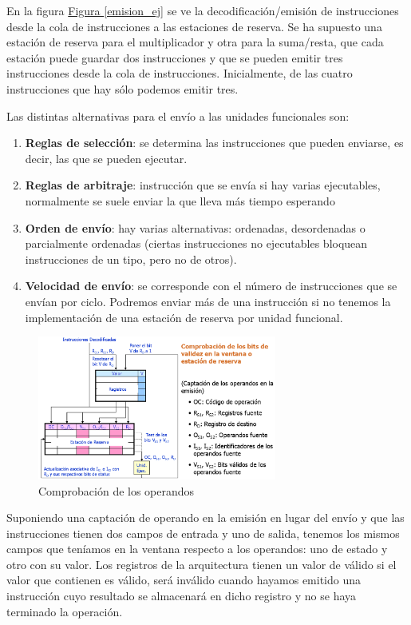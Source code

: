 \documentclass[10pt,a4paper,spanish]{report}
\begin{document}
En la figura \hyperref[emision_ej]{Figura \ref*{emision_ej}} se ve la decodificación/emisión de instrucciones desde la cola de instrucciones a las estaciones de reserva. Se ha supuesto una estación de reserva para el multiplicador y otra para la suma/resta, que cada estación puede guardar dos instrucciones y que se pueden emitir tres instrucciones desde la cola de instrucciones. Inicialmente, de las cuatro instrucciones que hay sólo podemos emitir tres. 

Las distintas alternativas para el envío a las unidades funcionales son:
\begin{enumerate}[\color{azul}{$\heartsuit$}]
    \item \textbf{\textcolor{azul}{Reglas de selección}}: se determina las instrucciones que pueden enviarse, es decir, las que se pueden ejecutar.
    \item \textbf{\textcolor{azul}{Reglas de arbitraje}}: instrucción que se envía si hay varias ejecutables, normalmente se suele enviar la que lleva más tiempo esperando
    \item \textbf{\textcolor{azul}{Orden de envío}}: hay varias alternativas: ordenadas, desordenadas o parcialmente ordenadas (ciertas instrucciones no ejecutables bloquean instrucciones de un tipo, pero no de otros).
    \item \textbf{\textcolor{azul}{Velocidad de envío}}: se corresponde con el número de instrucciones que se envían por ciclo. Podremos enviar más de una instrucción si no tenemos la implementación de una estación de reserva por unidad funcional.
\end{enumerate}

\begin{figure}[!h]
\centering
\includegraphics[width=0.7\textwidth]{93}
\caption{Comprobación de los operandos}
\label{comprobacion_operandos}
\end{figure}

Suponiendo una captación de operando en la emisión en lugar del envío y que las instrucciones tienen dos campos de entrada y uno de salida, tenemos los mismos campos que teníamos en la ventana respecto a los operandos: uno de estado y otro con su valor. Los registros de la arquitectura tienen un valor de válido si el valor que contienen es válido, será inválido cuando hayamos emitido una instrucción cuyo resultado se almacenará en dicho registro y no se haya terminado la operación.
\end{document}
